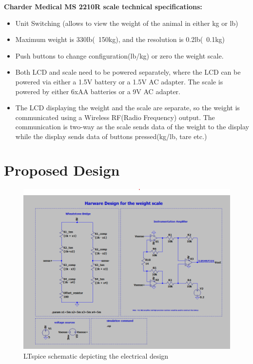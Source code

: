\textbf{Charder Medical MS 2210R scale technical specifications:}
\begin{itemize}
    \item Unit Switching (allows to view the weight of the animal in either kg or lb)
    \item Maximum weight is 330lb(~150kg), and the resolution is 0.2lb(~0.1kg)
    \item Push buttons to change configuration(lb/kg) or zero the weight scale.
    \item Both LCD and scale need to be powered separately, where the LCD can be powered via either a 1.5V battery or a 1.5V AC adapter. The scale is powered by either 6xAA batteries or a 9V AC adapter.
    \item The LCD displaying the weight and the scale are separate, so the weight is communicated using a Wireless RF(Radio Frequency) output. The communication is two-way as the scale sends data of the weight to the display while the display sends data of buttons pressed(kg/lb, tare etc.)
\end{itemize}

\chapter{Proposed Design }\label{appendix:proposed_design_hardware}
\begin{figure}
\centering
\includegraphics[width=1\textwidth]{images/hardwareDesign.png}
\caption{LTspice schematic depicting the electrical design}
\end{figure}

